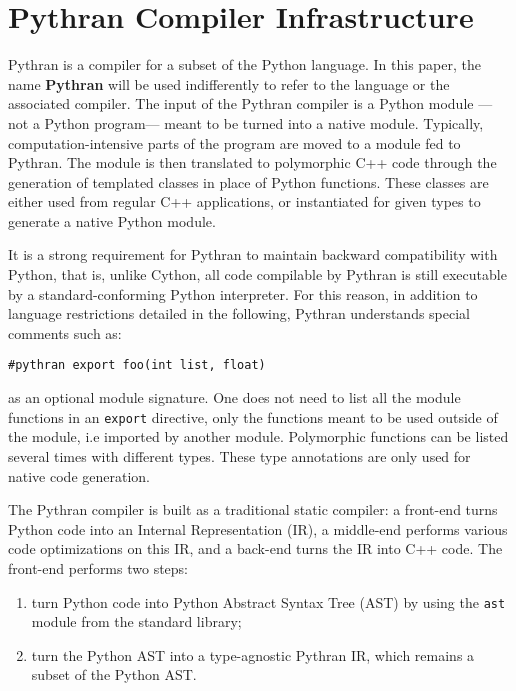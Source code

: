 \documentclass[10pt, onecolumn, preprint]{sigplanconf}
\begin{document}
\section{Pythran Compiler Infrastructure}
\label{sec:infrastructure}

Pythran is a compiler for a subset of the Python language. In this paper, the
name \textbf{Pythran} will be used indifferently to refer to the language or
the associated compiler. The input of the Pythran compiler is a Python module
---not a Python program--- meant to be turned into a native module. Typically,
computation-intensive parts of the program are moved to a module fed to
Pythran. The module is then translated to polymorphic C++ code through the
generation of templated classes in place of Python functions. These classes are
either used from regular C++ applications, or instantiated for given types to
generate a native Python module.

It is a strong requirement for Pythran to maintain backward compatibility with
Python, that is, unlike Cython, all code compilable by Pythran is still
executable by a standard-conforming Python interpreter. For this reason, in
addition to language restrictions detailed in the following, Pythran
understands special comments such as:

\begin{lstlisting}
#pythran export foo(int list, float)
\end{lstlisting}

as an optional module signature. One does not need to list all the module
functions in an \texttt{export} directive, only the functions meant to be used
outside of the module, i.e imported by another module.
Polymorphic functions can be listed several times with
different types. These type annotations are only used for native code generation.

The Pythran compiler is built as a traditional static compiler: a front-end
turns Python code into an Internal Representation (IR), a middle-end performs
various code optimizations on this IR, and a back-end turns the IR into C++
code. The front-end performs two steps:

\begin{enumerate}

    \item turn Python code into Python Abstract Syntax Tree (AST) by using the \texttt{ast}
   module from the standard library;

    \item turn the Python AST into a type-agnostic Pythran IR, which remains a subset
   of the Python AST.

\end{enumerate}
\end{document}
